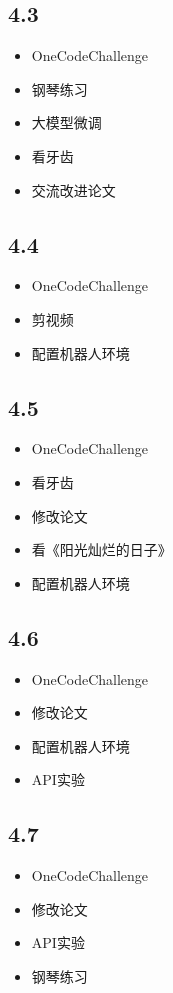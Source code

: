 \documentclass[UTF8]{ctexart}
\begin{document}
\subsection*{4.3}
\begin{itemize}
    \item OneCodeChallenge
    \item 钢琴练习
    \item 大模型微调
    \item 看牙齿
    \item 交流改进论文
\end{itemize}

\subsection*{4.4}
\begin{itemize}
    \item OneCodeChallenge
    \item 剪视频
    \item 配置机器人环境
\end{itemize}

\subsection*{4.5}
\begin{itemize}
    \item OneCodeChallenge
    \item 看牙齿
    \item 修改论文
    \item 看《阳光灿烂的日子》
    \item 配置机器人环境
\end{itemize}

\subsection*{4.6}
\begin{itemize}
    \item OneCodeChallenge
    \item 修改论文
    \item 配置机器人环境
    \item API实验
\end{itemize}

\subsection*{4.7}
\begin{itemize}
    \item OneCodeChallenge
    \item 修改论文
    \item API实验
    \item 钢琴练习
\end{itemize}
\end{document}
